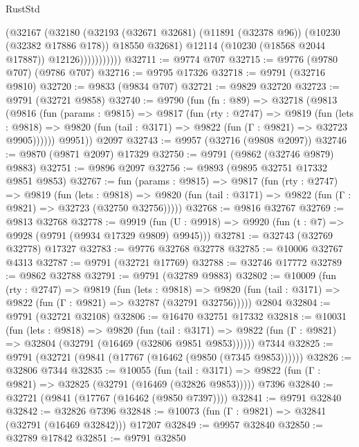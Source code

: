 \begin{lexlean}{RustStd}
\begin{coremodule}
                      (@32167
                        (@32180
                          (@32193
                            (@32671 @32681)
                            (@11891 (@32378 @96))
                            (@10230 (@32382 @17886 @178))
                            @18550
                            @32681)
                          @12114
                          (@10230 (@18568 @2044 @17887))
                          @12126)))))))))))
@32711 := @9774 @707
@32715 := @9776 (@9780 @707) (@9786 @707)
@32716 := @9795 @17326
@32718 := @9791 (@32716 @9810)
@32720 := @9833 (@9834 @707)
@32721 := @9829 @32720
@32723 := @9791 (@32721 @9858)
@32740 := @9790
    (fun (fn : @89) =>
    @32718
      (@9813
        (@9816
          (fun (params : @9815) =>
          @9817
            (fun (rty : @2747) =>
            @9819
              (fun (lets : @9818) =>
              @9820 (fun (tail : @3171) => @9822 (fun (Γ : @9821) => @32723 @9905))))))
        @9951))
    @2097
@32743 := @9957 (@32716 (@9808 @2097))
@32746 := @9870 (@9871 @2097) @17329
@32750 := @9791 (@9862 (@32746 @9879) @9883)
@32751 := @9896 @2097
@32756 := @9893 (@9895 @32751 @17332 @9851 @9853)
@32767 := fun (params : @9815) =>
  @9817
    (fun (rty : @2747) =>
    @9819
      (fun (lets : @9818) =>
      @9820 (fun (tail : @3171) => @9822 (fun (Γ : @9821) => @32723 (@32750 @32756)))))
@32768 := @9816 @32767
@32769 := @9813 @32768
@32778 := @9919
    (fun (U : @9918) => @9920 (fun (t : @7) => @9928 (@9791 (@9934 @17329 @9809) @9945)))
@32781 := @32743 (@32769 @32778) @17327
@32783 := @9776 @32768 @32778
@32785 := @10006 @32767 @4313
@32787 := @9791 (@32721 @17769)
@32788 := @32746 @17772
@32789 := @9862 @32788
@32791 := @9791 (@32789 @9883)
@32802 := @10009
    (fun (rty : @2747) =>
    @9819
      (fun (lets : @9818) =>
      @9820 (fun (tail : @3171) => @9822 (fun (Γ : @9821) => @32787 (@32791 @32756)))))
    @2804
@32804 := @9791 (@32721 @32108)
@32806 := @16470 @32751 @17332
@32818 := @10031
    (fun (lets : @9818) =>
    @9820
      (fun (tail : @3171) =>
      @9822 (fun (Γ : @9821) => @32804 (@32791 (@16469 (@32806 @9851 @9853))))))
    @7344
@32825 := @9791 (@32721 (@9841 (@17767 (@16462 (@9850 (@7345 @9853))))))
@32826 := @32806 @7344
@32835 := @10055
    (fun (tail : @3171) => @9822 (fun (Γ : @9821) => @32825 (@32791 (@16469 (@32826 @9853)))))
    @7396
@32840 := @32721 (@9841 (@17767 (@16462 (@9850 @7397))))
@32841 := @9791 @32840
@32842 := @32826 @7396
@32848 := @10073 (fun (Γ : @9821) => @32841 (@32791 (@16469 @32842))) @17207
@32849 := @9957 @32840
@32850 := @32789 @17842
@32851 := @9791 @32850

\end{coremodule}
\end{lexlean}
